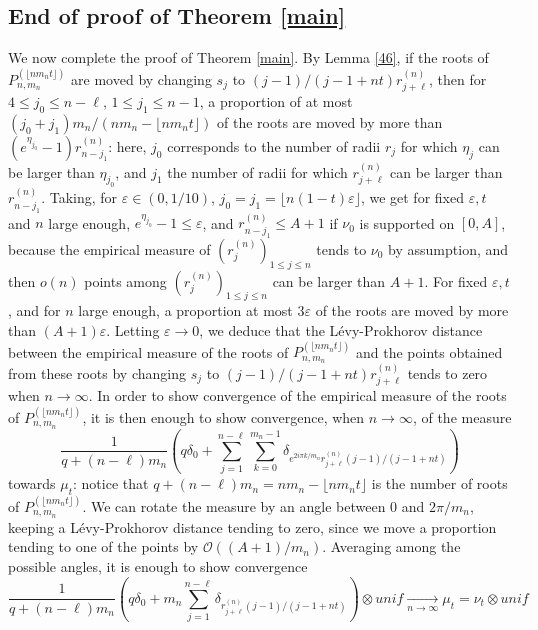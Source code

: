 \documentclass[11pt]{amsart}
\begin{document}
\subsection{End of proof of Theorem \ref{main}}
We now complete the proof of Theorem \ref{main}. 
By Lemma \ref{46}, if the roots of $P_{n,m_n}^{(\lfloor n m_n t \rfloor)}$ are moved by changing $s_j$ to 
$(j-1)/(j-1 + nt) r_{j+ \ell}^{(n)}$, 
then for $4 \leq j_0 \leq n- \ell$, 
$1 \leq j_1 \leq n-1$,
a proportion of 
at most $(j_0 + j_1) m_n / (n m_n - \lfloor n m_n t\rfloor)$ of the roots are moved 
by more than $(e^{\eta_{j_0}} - 1) r^{(n)}_{n- j_1}$: here, $j_0$ corresponds to the number of radii $r_j$ for which $\eta_j$ can be
larger than $\eta_{j_0}$, and $j_1$
the number of radii for which $r_{j+\ell}^{(n)}$ can be larger than $r^{(n)}_{n- j_1}$. 
Taking, for $\varepsilon \in (0, 1/10)$, 
$j_0 = j_1 = \lfloor n (1-t) \varepsilon \rfloor$, we get for fixed $\varepsilon, t$ and $n$ large enough, $e^{\eta_{j_0}} - 1 \leq \varepsilon$, and 
$r^{(n)}_{n- j_1} \leq A + 1$
if $\nu_0$ is supported on $[0, A]$, 
because the empirical measure 
of $(r_j^{(n)})_{1 \leq j \leq n}$ tends to $\nu_0$ by assumption, and then 
$o(n)$ points among $(r_j^{(n)})_{1 \leq j \leq n}$ can be larger than $A+1$. 
For fixed $\varepsilon, t$, and for $n$ large enough, 
a proportion at most $3 \varepsilon$
of the roots are moved by more than $(A+1) \varepsilon$. Letting $\varepsilon \rightarrow 0$, we deduce that the L\'evy-Prokhorov distance between the empirical measure of 
the roots of $P_{n,m_n}^{(\lfloor n m_n t \rfloor)}$ and the points obtained from these roots by changing $s_j$ to $(j-1)/(j-1 + nt) r_{j+ \ell}^{(n)}$ tends to zero when $n \rightarrow \infty$. In order to show 
convergence of the empirical measure of the
roots of $P_{n,m_n}^{(\lfloor n m_n t \rfloor)}$, it is then enough 
to show convergence, when $n \rightarrow \infty$, 
of the measure 
$$\frac{1}{q + (n- \ell) m_{n}} \left( q \delta_0 + \sum_{j=1}^{n-\ell} \sum_{k=0}^{m_{n}-1}
\delta_{e^{2 i\pi k/m_n} r_{j+\ell}^{(n)} (j-1)/(j-1 + nt) } \right)
$$
towards $\mu_t$: 
notice that $q + (n-\ell) m_n = n m_n - \lfloor n m_n t\rfloor$ is the number of 
roots of $P_{n, m_n}^{(\lfloor n m_n t \rfloor)}$. 
We can rotate the measure by an 
angle between $0$ and $2 \pi /m_n$, keeping a L\'evy-Prokhorov distance tending to zero, since we move a proportion tending to one of the points 
by $\mathcal{O} ((A+1) /m_n)$. Averaging 
among the possible angles, it is enough to show 
convergence 
$$\frac{1}{q + (n- \ell) m_{n}}
\left(q \delta_0 + m_n \sum_{j=1}^{n-\ell}
\delta_{ r_{j+\ell}^{(n)} (j-1)/(j-1 + nt) }
\right) \otimes unif
\underset{n \rightarrow \infty}{\longrightarrow } \mu_t = \nu_t \otimes unif$$
\end{document}
